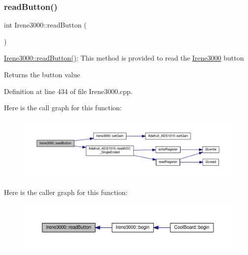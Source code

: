 \subsubsection{\texorpdfstring{read\+Button()}{readButton()}}
{\footnotesize\ttfamily int Irene3000\+::read\+Button (\begin{DoxyParamCaption}{ }\end{DoxyParamCaption})}

\hyperlink{class_irene3000_a78a87eb7cf295b95c12b2ebd51c2bb77}{Irene3000\+::read\+Button()}\+: This method is provided to read the \hyperlink{class_irene3000}{Irene3000} button

\begin{DoxyReturn}{Returns}
the button value 
\end{DoxyReturn}


Definition at line 434 of file Irene3000.\+cpp.

Here is the call graph for this function\+:\nopagebreak
\begin{figure}[H]
\begin{center}
\leavevmode
\includegraphics[width=350pt]{class_irene3000_a78a87eb7cf295b95c12b2ebd51c2bb77_cgraph}
\end{center}
\end{figure}
Here is the caller graph for this function\+:\nopagebreak
\begin{figure}[H]
\begin{center}
\leavevmode
\includegraphics[width=350pt]{class_irene3000_a78a87eb7cf295b95c12b2ebd51c2bb77_icgraph}
\end{center}
\end{figure}
\mbox{\label{class_irene3000_a436fc0a06681cd0784aba56b9707f19a}} 
